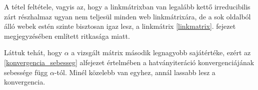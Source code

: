 \documentclass[12pt,a4paper]{article}
\begin{document}
A tétel feltétele, vagyis az, hogy a linkmátrixban van legalább kettő irreducibilis zárt részhalmaz ugyan nem teljesül minden web linkmátrixára, de a sok oldalból álló webek estén szinte bisztosan igaz lesz, a linkmátrix \ref{linkmatrix}. fejezet megjegyzésében említett ritkasága miatt.

Láttuk tehát, hogy $\alpha$ a vizsgált mátrix második legnagyobb sajátértéke, ezért az \ref{konvergencia_sebesseg} alfejezet értelmében a hatványiteráció konvergenciájának sebessége függ $\alpha$-tól. Minél közelebb van egyhez, annál lassabb lesz a konvergencia.



\end{document}

